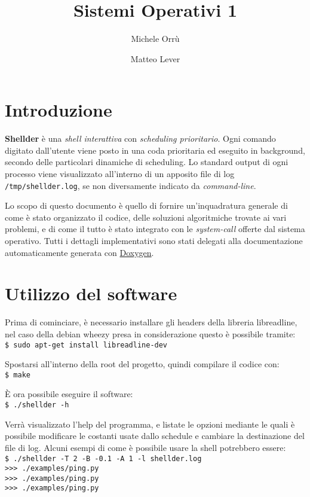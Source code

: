 \documentclass[11pt]{article}
\title{\textbf{Sistemi Operativi 1}}
\author{Michele Orr\`u \and Matteo Lever}
\date{}
\begin{document}
\newcommand{\code}{\texttt}

\maketitle

\section{Introduzione}

\textbf{Shellder} \`e una \emph{shell interattiva} con \emph{scheduling prioritario}.
Ogni comando digitato dall'utente viene posto in una coda prioritaria ed
eseguito in background, secondo delle particolari dinamiche di scheduling. Lo
standard output di ogni processo viene visualizzato all'interno di un apposito
file di log \code{/tmp/shellder.log}, se non diversamente indicato da
\emph{command-line}.

Lo scopo di questo documento \`e quello di fornire un'inquadratura generale di
come \`e stato organizzato il codice, delle soluzioni algoritmiche trovate ai
vari problemi, e di come il tutto \`e stato integrato con le \emph{system-call}
offerte dal sistema operativo. Tutti i dettagli implementativi sono stati
delegati alla documentazione automaticamente generata con
\href{http://www.stack.nl/~dimitri/doxygen/}{Doxygen}.

\section{Utilizzo del software}
\label{usage}

Prima di cominciare, \`e necessario installare gli headers della libreria libreadline,
nel caso della debian wheezy presa in considerazione questo \`e possibile tramite:
\\ \code{\$ sudo apt-get install libreadline-dev}

\noindent Spostarsi all'interno della root del progetto, quindi compilare il codice con:
\\ \code{\$ make}

\noindent \`E ora possibile eseguire il software:
\\ \code{\$ ./shellder -h}

\noindent Verr\`a visualizzato l'help del programma, e listate le opzioni mediante le quali \`e
possibile modificare le costanti usate dallo schedule e cambiare la destinazione del file di log.
Alcuni esempi di come \`e possibile usare la shell potrebbero essere:
\\ \code{\$ ./shellder  -T 2  -B -0.1  -A 1  -l shellder.log}
\\ \code{>>> ./examples/ping.py }
\\ \code{>>> ./examples/ping.py }
\\ \code{>>> ./examples/ping.py }
\end{document}
